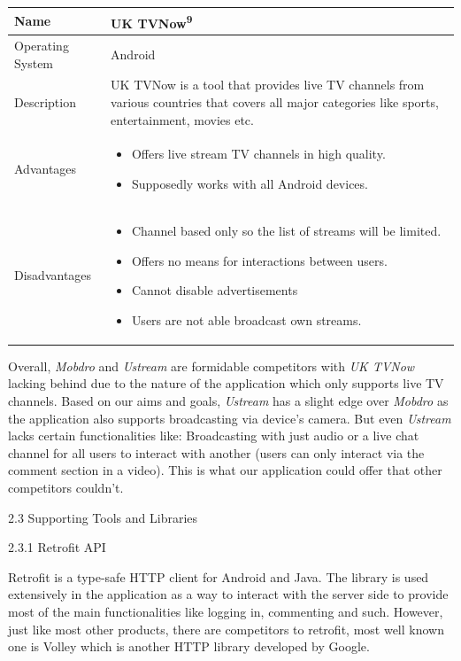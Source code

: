 \documentclass{article}
\begin{document}
\begin{flushleft}
\begin{tabular}{| p{2.2cm} | p{9cm} |}
\hline
Name & UK TVNow\textsuperscript{9}\\
\hline
Operating System & Android\\
\hline
Description & UK TVNow is a tool that provides live TV channels from various countries that covers all major categories like sports, entertainment, movies etc.\\
\hline
Advantages &
\begin{itemize}
	\item Offers live stream TV channels in high quality.
	\item Supposedly works with all Android devices.
\end{itemize}\\
\hline
Disadvantages &
\begin{itemize}
	\item Channel based only so the list of streams will be limited.
	\item Offers no means for interactions between users.
	\item Cannot disable advertisements
	\item Users are not able broadcast own streams.
\end{itemize}\\
\hline
\end{tabular} \par
Overall, \textit{Mobdro} and \textit{Ustream} are formidable competitors with \textit{UK TVNow} lacking behind due to the nature of the application which only supports live TV channels. Based on our aims and goals, \textit{Ustream} has a slight edge over \textit{Mobdro} as the application also supports broadcasting via device's camera. But even \textit{Ustream} lacks certain functionalities like: Broadcasting with just audio or a live chat channel for all users to interact with another (users can only interact via the comment section in a video). This is what our application could offer that other competitors couldn't.\par
{\Large 2.3 Supporting Tools and Libraries}\par
{\large 2.3.1 Retrofit API}\par
Retrofit is a type-safe HTTP client for Android and Java. The library is used extensively in the application as a way to interact with the server side to provide most of the main functionalities like logging in, commenting and such. However, just like most other products, there are competitors to retrofit, most well known one is Volley which is another HTTP library developed by Google.\par

\end{flushleft}
\end{document}
